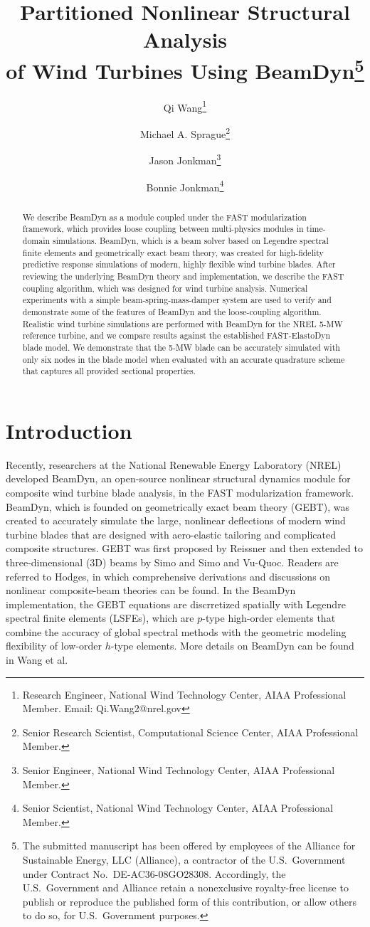 \documentclass{aiaa-tc}
\title{Partitioned Nonlinear Structural Analysis\\
of Wind Turbines Using BeamDyn\thanks{The submitted manuscript has been offered by employees
of the Alliance for Sustainable Energy, LLC (Alliance), a contractor of the U.S.\
Government under Contract No.\ DE-AC36-08GO28308.  Accordingly, the U.S.\
Government and Alliance retain a nonexclusive royalty-free license to publish or
reproduce the published form of this contribution, or allow others to do so, for
U.S.\ Government purposes.} }
\author[]{Qi Wang\thanks{Research Engineer, National Wind Technology Center, AIAA Professional Member. Email: Qi.Wang2@nrel.gov}}
\author[]{Michael A. Sprague\thanks{Senior Research Scientist, 
Computational Science Center, AIAA Professional Member.}}
\author[]{Jason Jonkman\thanks{Senior Engineer, National Wind Technology Center, AIAA Professional Member.}}
\author[]{Bonnie Jonkman\thanks{Senior Scientist, National Wind Technology Center, AIAA Professional Member.}}
\affil[]{National Renewable Energy Laboratory, Golden, CO 80401}
\begin{document}
\maketitle

\begin{abstract}
{We describe BeamDyn as a module coupled under the FAST modularization framework, which provides loose coupling between multi-physics modules in time-domain simulations.
BeamDyn, which is a beam solver based on Legendre spectral finite elements and geometrically exact beam theory, was created for high-fidelity predictive response simulations of modern, highly flexible wind turbine blades.  
After reviewing the underlying BeamDyn theory and implementation, we describe the FAST coupling algorithm, which was designed for wind turbine analysis.  
Numerical experiments with a simple beam-spring-mass-damper system are used to verify and demonstrate some of the features of BeamDyn and the loose-coupling algorithm.  
Realistic wind turbine simulations are performed with BeamDyn for the NREL 5-MW reference turbine, and we compare results against the established FAST-ElastoDyn blade model.  
We demonstrate that the 5-MW blade can be accurately simulated with only six nodes in the blade model  when evaluated with an accurate quadrature scheme that captures all provided sectional properties.}
\end{abstract}

\section{Introduction} 
Recently, researchers at the National Renewable Energy Laboratory (NREL) 
developed BeamDyn\cite{Wang:SFE2013,Wang:GEBT2014,Wang-etal:2015,website:beamdyn}, an open-source nonlinear structural dynamics module for composite wind turbine blade analysis, in the FAST modularization framework.   
BeamDyn, which is founded on geometrically exact beam theory (GEBT), was created to accurately simulate the large, nonlinear deflections of modern wind turbine blades that are designed with aero-elastic tailoring and complicated composite structures.
GEBT was first proposed by Reissner\cite{Ressiner1973} and then extended to three-dimensional (3D) beams by Simo\cite{Simo1985} and Simo and Vu-Quoc\cite{Simo1986}. 
Readers are referred to
Hodges,\cite{HodgesBeamBook} in which comprehensive derivations and discussions
on nonlinear composite-beam theories can be found. 
In the BeamDyn implementation, the GEBT equations are discrretized spatially with Legendre spectral finite elements (LSFEs), which are $p$-type high-order elements that combine the accuracy of global spectral methods with the geometric modeling flexibility of low-order $h$-type elements.
More details on BeamDyn can be found in Wang et al.\cite{Wang:GEBT2014}
\end{document}
